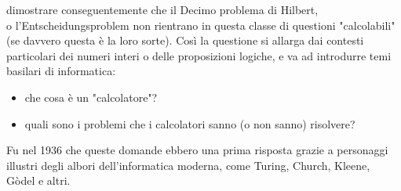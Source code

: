 dimostrare conseguentemente che il Decimo problema di Hilbert, \\o l'Entscheidungsproblem non rientrano in questa
classe di questioni "calcolabili" (se davvero questa è la loro sorte).
Così la questione si allarga dai contesti particolari
dei numeri interi o delle proposizioni logiche, e va ad introdurre temi basilari di
informatica:

\begin{itemize}
    \item che cosa è un "calcolatore"?
    \item quali sono i problemi che i calcolatori sanno (o non sanno) risolvere?
\end{itemize}

Fu nel 1936 che queste domande ebbero una prima risposta grazie a personaggi illustri degli albori
dell'informatica moderna, come Turing, Church, Kleene, Gòdel e altri.